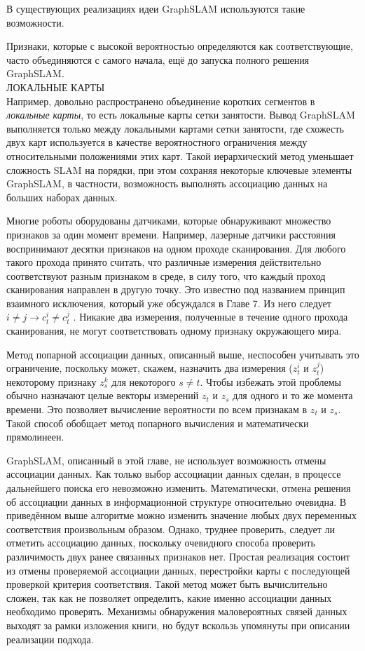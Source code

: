 \documentclass[10pt,a4paper]{article}
\begin{document}
В существующих реализациях идеи GraphSLAM используются такие возможности.

Признаки, которые с высокой вероятностью определяются как соответствующие, часто объединяются с самого начала, ещё до запуска полного решения GraphSLAM.\\
ЛОКАЛЬНЫЕ КАРТЫ\\
Например, довольно распространено объединение коротких сегментов в \textit{локальные карты}, то есть локальные карты сетки занятости. Вывод GraphSLAM выполняется только между локальными картами сетки занятости, где схожесть двух карт используется в качестве вероятностного ограничения между относительными положениями этих карт. Такой иерархический метод уменьшает сложность SLAM на порядки, при этом сохраняя некоторые ключевые элементы GraphSLAM, в частности, возможность выполнять ассоциацию данных на больших наборах данных.

Многие роботы оборудованы датчиками, которые обнаруживают множество признаков за один момент времени. Например, лазерные датчики расстояния воспринимают десятки признаков на одном проходе сканирования. Для любого такого прохода принято считать, что различные измерения действительно соответствуют разным признаком в среде, в силу того, что каждый проход сканирования направлен в другую точку. Это известно под названием принцип взаимного исключения, который уже обсуждался в Главе 7. Из него следует $i\neq j\longrightarrow c_t^i\neq c_t^j$ . Никакие два измерения,
полученные в течение одного прохода сканирования, не могут соответствовать одному признаку окружающего мира.

Метод попарной ассоциации данных, описанный выше, неспособен учитывать это ограничение, поскольку может, скажем, назначить два измерения ($z_t^i$ и $z_t^j$) некоторому признаку $z_s^k$ для некоторого $s\neq t$. Чтобы избежать этой проблемы обычно назначают целые векторы измерений $z_t$ и $z_s$ для одного и то же момента времени. Это позволяет вычисление вероятности по всем признакам в $z_t$ и $z_s$. Такой способ обобщает метод попарного вычисления и математически прямолинеен. 

GraphSLAM, описанный в этой главе, не использует возможность отмены ассоциации данных. Как только выбор ассоциации данных сделан, в процессе дальнейшего поиска его невозможно изменить. Математически, отмена решения об ассоциации данных в информационной структуре относительно очевидна. В приведённом выше алгоритме можно изменить значение любых двух переменных соответствия произвольным образом. Однако, труднее проверить, следует ли отметить ассоциацию данных, поскольку очевидного способа проверить различимость двух ранее связанных признаков нет. Простая реализация состоит из отмены проверяемой ассоциации данных, перестройки карты с последующей проверкой критерия соответствия. Такой метод может быть вычислительно сложен, так как не позволяет определить, какие именно ассоциации данных необходимо проверять. Механизмы обнаружения маловероятных связей данных выходят за рамки изложения книги, но будут вскользь упомянуты при описании реализации подхода.
\end{document}

